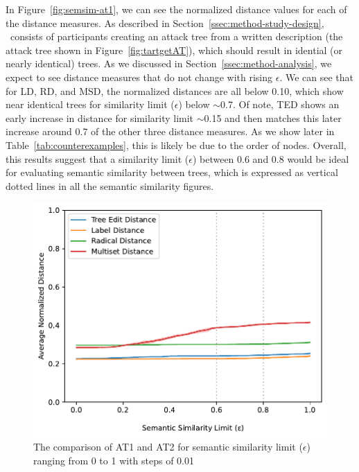 In Figure~\ref{fig:semsim-at1}, we can see the normalized distance values for each of the distance measures. As described in Section~\ref{ssec:method-study-design}, \ATone\ consists of participants creating an attack tree from a written description (the attack tree shown in Figure~\ref{fig:tartgetAT}), which should result in idential (or nearly identical) trees. As we discussed in Section~\ref{ssec:method-analysis}, we expect to see distance measures that do not change with rising $\epsilon$. We can see that for LD, RD, and MSD, the normalized distances are all below 0.10, which show near identical trees for similarity limit ($\epsilon$) below $\sim$0.7. Of note, TED shows an early increase in distance for similarity limit $\sim$0.15 and then matches this later increase around 0.7 of the other three distance measures. As we show later in Table~\ref{tab:counterexamples}, this is likely be due to the order of nodes. Overall, this results suggest that a similarity limit ($\epsilon$) between 0.6 and 0.8 would be ideal for evaluating semantic similarity between trees, which is expressed as vertical dotted lines in all the semantic similarity figures.

\begin{figure}
\includegraphics[width=\linewidth]{code/img/similaritylimits_at1-2_percentage.pdf}
\caption{The comparison of AT1 and AT2 for semantic similarity limit ($\epsilon$) ranging from 0 to 1 with steps of 0.01}
\label{fig:semsim-at1-2}
\end{figure}



